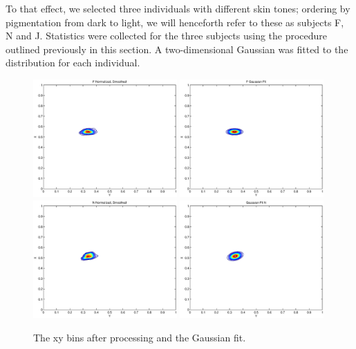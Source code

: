 To that effect, we selected three individuals with different skin tones; ordering by pigmentation from dark to light, we will henceforth refer to these as subjects F, N and J. Statistics were collected for the three subjects using the procedure outlined previously in this section. A two-dimensional Gaussian was fitted to the distribution for each individual.

\begin{figure}[h!]
  \caption{The xy bins after processing and the Gaussian fit.}
  \label{fig:FBinAndGFit}
  \centering
    \includegraphics[width=0.49\textwidth]{Chapter2/Figs/FHands_XY_fBin.eps}
    \includegraphics[width=0.49\textwidth]{Chapter2/Figs/FHands_XY_gFit.eps}
    \includegraphics[width=0.49\textwidth]{Chapter2/Figs/NHands_XY_fBin.eps}
    \includegraphics[width=0.49\textwidth]{Chapter2/Figs/NHands_XY_gFit.eps}

\end{figure}
